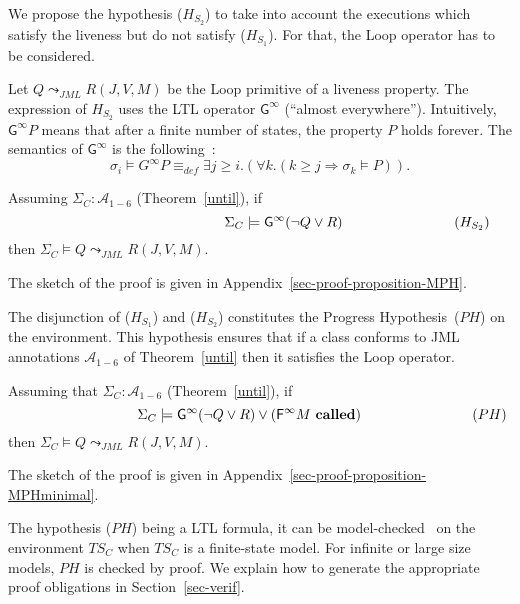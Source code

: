 We propose the hypothesis ($H_{S_2}$) to take into account the executions
which satisfy the liveness but do not satisfy ($H_{S_1}$).  For that, the
\textsf{Loop} operator has to be considered.

Let $Q \leadsto_{JML} R (J,V,M)$ be the \textsf{Loop} primitive of a
liveness property. 
The expression of $H_{S_2}$ uses the LTL operator 
$\mathsf{G^{\infty}}$ (``almost everywhere''). 
Intuitively, $\mathsf{G^{\infty}}P$ means 
that after a finite number of states, the property $P$ holds forever.
The semantics of $\mathsf{G^{\infty}}$ is the following~:
$$\sigma_i \models G^{\infty} P \equiv_{def} \exists j \geq i . (\forall k . 
( k \geq j \Rightarrow \sigma_k \models P)).$$ 

\begin{proposition}
\label{prop-hs}
Assuming $\Sigma_C : \mathcal{A}_{1-6}$ (Theorem~\ref{until}),
if
$$\hspace*{14em} \Sigma_C \models  \mathsf{G^{\infty}}  
(\neg Q \vee R) \hspace*{8em} (H_{S_2}) $$
then $\Sigma_C \models  Q \leadsto_{JML} R (J,V,M)$. 
\end{proposition}
The sketch of the proof is given
in Appendix~\ref{sec-proof-proposition-MPH}.



The disjunction of ($H_{S_1}$) and ($H_{S_2}$) 
constitutes the Progress Hypothesis~($PH$)
on the environment. This hypothesis ensures that if a class conforms 
to JML annotations $\mathcal{A}_{1-6}$ of Theorem~\ref{until} 
then it satisfies the \textsf{Loop} operator.


\begin{proposition}
Assuming that $\Sigma_C : \mathcal{A}_{1-6}$ (Theorem~\ref{until}),
if 
$$\hspace*{9em} \Sigma_C \models  \mathsf{G^{\infty}}  
(\neg Q \vee R) \vee
(\mathsf{F^{\infty}} M ~ \mathbf{called}) \hspace{8em} (PH)$$ 
then $\Sigma_C \models  Q \leadsto_{JML} R (J,V,M)$. 
\end{proposition} 
The sketch of the proof is given 
in Appendix~\ref{sec-proof-proposition-MPHminimal}.



The hypothesis ($PH$) being a LTL formula, it can be
model-checked~\cite{spin97,Moped03} on the environment $TS_C$ when $TS_C$
is a finite-state model. For infinite or large size models, $PH$ is checked by
proof. We explain how to generate the appropriate proof obligations 
in Section~\ref{sec-verif}.


